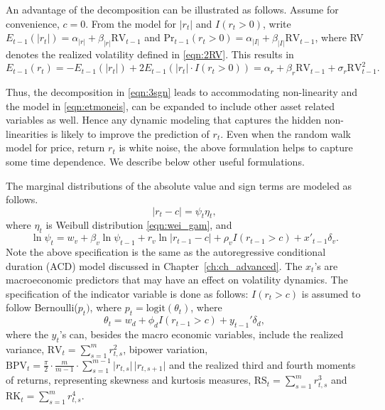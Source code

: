 An advantage of the decomposition can be illustrated as follows. Assume for convenience, $c = 0$. From the model for $|r_t|$ and $I(r_t > 0)$, write $E_{t-1}(\left|r_{t}\right|) = \alpha_{\left|r\right|} + \beta_{\left| r \right|}\text{RV}_{t-1}$ and $\text{Pr}_{t-1}(r_t >0) = \alpha_{\left| I \right|} + \beta_{\left| I \right|}\text{RV}_{t-1}$, where RV denotes the realized volatility defined in \eqref{eqn:2RV}. This results in
	\begin{equation} \label{eqn:etmoneis}
	E_{t-1}(r_t)= -E_{t-1}(\left| r_t \right|) + 2E_{t-1}(\left| r_{t} \right| \cdot I(r_{t} > 0))= \alpha_{r} + \beta_{r} \text{RV}_{t-1} + \sigma_{r} \text{RV}_{t-1}^2.
	\end{equation}


Thus, the decomposition in \eqref{eqn:3sgn} leads to accommodating non-linearity and the model in \eqref{eqn:etmoneis}, can be expanded to include other asset related variables as well. Hence any dynamic modeling that captures the hidden non-linearities is likely to improve the prediction of $r_{t}$. Even when the random walk model for price, return $r_t$ is white noise, the above formulation helps to capture some time dependence. We describe below other useful formulations.


The marginal distributions of the absolute value and sign terms are modeled as follows.
	\begin{equation} \label{eqn:psieta}
	\lvert r_{t} - c \rvert = \psi_{t} \eta_{t},
	\end{equation}
where $\eta_{t}$ is Weibull distribution \eqref{eqn:wei_gam}, and
	\begin{equation} \label{eqn:lnspi}
	\ln{\psi_{t}} = w_{v} + \beta_{v} \ln{\psi_{t-1}} + r_{v} \ln\lvert r_{t-1} - c \rvert + \rho_{v} I(r_{t-1}>c) + x'_{t-1} \delta_{v}.
	\end{equation}
Note the above specification is the same as the autoregressive conditional duration (ACD) model discussed in Chapter~\ref{ch:ch_advanced}. The $x_{t}$'s  are macroeconomic predictors that may have an effect on volatility dynamics. The specification of the indicator variable is done as follows: $I(r_{t} > c)$ is assumed to follow Bernoulli($p_{t})$, where $p_{t} = \text{logit}(\theta_{t})$, where 
	\begin{equation}\label{eqn:3thetat}
	\theta_{t} = w_{d} + \phi_{d}I (r_{t-1}>c) + y_{t-1}'\delta_{d},
	\end{equation}
where the $y_{t}$'s can, besides the macro economic variables, include the realized variance, $\text{RV}_{t} = \sum_{s=1}^{m} r^2_{t,s}$, bipower variation, $\text{BPV}_{t} = \frac{\pi}{2} \cdot \frac{m}{m-1} \cdot \sum_{s=1}^{m-1} \lvert r_{t,s}\rvert\, \lvert r_{t,s+1}\rvert$ and the realized third and fourth moments of returns, representing skewness and kurtosis measures, $\text{RS}_{t} = \sum_{s=1}^m r_{t,s}^3$ and $\text{RK}_{t} = \sum_{s=1}^{m} r_{t,s}^4$.


